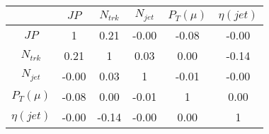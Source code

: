 \begin{tabular}{|c|c|c|c|c|c|} 
\hline
 & $JP$ & $N_{trk}$ & $N_{jet}$ & $P_{T} (\mu)$ & $\eta (jet)$ \\ \hline
$JP$ & 1 & 0.21 & -0.00 & -0.08 & -0.00 \\
$N_{trk}$ & 0.21 & 1 & 0.03 & 0.00 & -0.14 \\
$N_{jet}$ & -0.00 & 0.03 & 1 & -0.01 & -0.00 \\
$P_{T} (\mu)$ & -0.08 & 0.00 & -0.01 & 1 & 0.00 \\
$\eta (jet)$ & -0.00 & -0.14 & -0.00 & 0.00 & 1 \\
\hline 
\end{tabular} 


